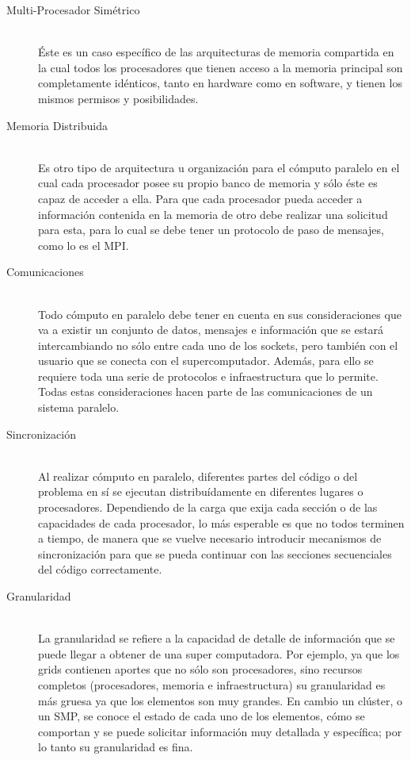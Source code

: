 \documentclass{article}
\begin{document}
\begin{description}
	\item[Multi-Procesador Simétrico] \hfill \\
	Éste es un caso específico de las arquitecturas de memoria compartida en la cual todos los procesadores que tienen acceso a la memoria principal son completamente idénticos, tanto en hardware como en software, y tienen los mismos permisos y posibilidades.
	\item[Memoria Distribuida] \hfill \\
	Es otro tipo de arquitectura u organización para el cómputo paralelo en el cual cada procesador posee su propio banco de memoria y sólo éste es capaz de acceder a ella. Para que cada procesador pueda acceder a información contenida en la memoria de otro debe realizar una solicitud para esta, para lo cual se debe tener un protocolo de paso de mensajes, como lo es el MPI.
	\item[Comunicaciones] \hfill	\\
	Todo cómputo en paralelo debe tener en cuenta en sus consideraciones que va a existir un conjunto de datos, mensajes e información que se estará intercambiando no sólo entre cada uno de los sockets, pero también con el usuario que se conecta con el supercomputador. Además, para ello se requiere toda una serie de protocolos e infraestructura que lo permite. Todas estas consideraciones hacen parte de las comunicaciones de un sistema paralelo.
	\item[Sincronización] \hfill \\
	Al realizar cómputo en paralelo, diferentes partes del código o del problema en sí se ejecutan distribuídamente en diferentes lugares o procesadores. Dependiendo de la carga que exija cada sección o de las capacidades de cada procesador, lo más esperable es que no todos terminen a tiempo, de manera que se vuelve necesario introducir mecanismos de sincronización para que se pueda continuar con las secciones secuenciales del código correctamente.
	\item[Granularidad]	\hfill \\
	La granularidad se refiere a la capacidad de detalle de información que se puede llegar a obtener de una super computadora. Por ejemplo, ya que los grids contienen aportes que no sólo son procesadores, sino recursos completos (procesadores, memoria e infraestructura) su granularidad es más gruesa ya que los elementos son muy grandes. En cambio un clúster, o un SMP, se conoce el estado de cada uno de los elementos, cómo se comportan y se puede solicitar información muy detallada y específica; por lo tanto su granularidad es fina.

\end{description}
\end{document}
